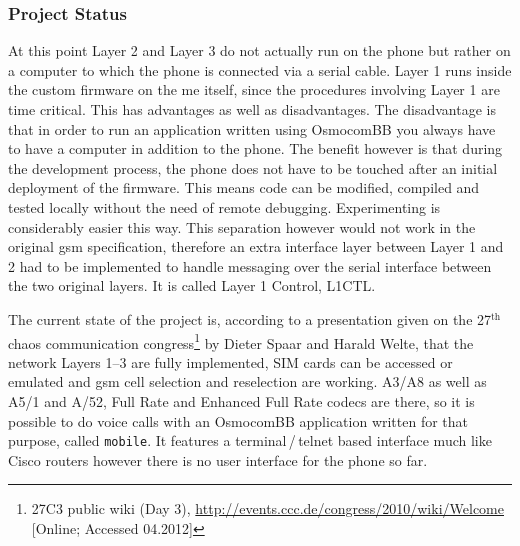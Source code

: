 \subsubsection{Project Status}
At this point Layer 2 and Layer 3 do not actually run on the phone but rather on a computer to which the phone is connected via a serial cable.
Layer 1 runs inside the custom firmware on the \gls{me} itself, since the procedures involving Layer 1 are time critical.
This has advantages as well as disadvantages.
The disadvantage is that in order to run an application written using OsmocomBB you always have to have a computer in addition to the phone.
The benefit however is that during the development process, the phone does not have to be touched after an initial deployment of the firmware.
This means code can be modified, compiled and tested locally without the need of remote debugging.
Experimenting is considerably easier this way.
This separation however would not work in the original \gls{gsm} specification, therefore an extra interface layer between Layer 1 and 2 had to be implemented to handle messaging over the serial interface between the two original layers.
It is called Layer 1 Control, L1CTL.

The current state of the project is, according to a presentation given on the 27$^\text{th}$ chaos communication congress\footnote{27C3 public wiki (Day 3), \url{http://events.ccc.de/congress/2010/wiki/Welcome} [Online; Accessed 04.2012]} by Dieter Spaar and Harald Welte, that the network Layers 1--3 are fully implemented, SIM cards can be accessed or emulated and \gls{gsm} cell selection and reselection are working.
A3/A8 as well as A5/1 and A/52, Full Rate and Enhanced Full Rate codecs are there, so it is possible to do voice calls with an OsmocomBB application written for that purpose, called \texttt{mobile}.
It features a terminal\,/\,telnet based interface much like Cisco routers however there is no user interface for the phone so far.

